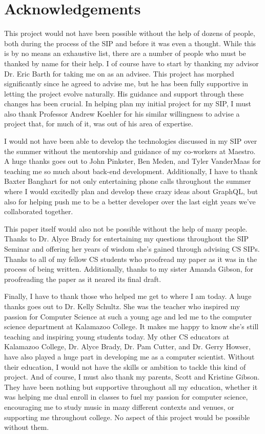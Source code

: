 \section*{Acknowledgements}
This project would not have been possible without the help of dozens of people, both during the process of the SIP and before it was even a thought.  While this is by no means an exhaustive list, there are a number of people who must be thanked by name for their help.  I of course have to start by thanking my advisor Dr. Eric Barth for taking me on as an advisee.  This project has morphed significantly since he agreed to advise me, but he has been fully supportive in letting the project evolve naturally.  His guidance and support through these changes has been crucial.  In helping plan my initial project for my SIP, I must also thank Professor Andrew Koehler for his similar willingness to advise a project that, for much of it, was out of his area of expertise.

I would not have been able to develop the technologies discussed in my SIP over the summer without the mentorship and guidance of my co-workers at Maestro.  A huge thanks goes out to John Pinkster, Ben Meden, and Tyler VanderMaas for teaching me so much about back-end development.  Additionally, I have to thank Baxter Banghart for not only entertaining phone calls throughout the summer where I would excitedly plan and develop these crazy ideas about GraphQL, but also for helping push me to be a better developer over the last eight years we've collaborated together.

This paper itself would also not be possible without the help of many people.  Thanks to Dr. Alyce Brady for entertaining my questions throughout the SIP Seminar and offering her years of wisdom she's gained through advising CS SIPs.  Thanks to all of my fellow CS students who proofread my paper as it was in the process of being written.  Additionally, thanks to my sister Amanda Gibson, for proofreading the paper as it neared its final draft.

Finally, I have to thank those who helped me get to where I am today.  A huge thanks goes out to Dr. Kelly Schultz.  She was the teacher who inspired my passion for Computer Science at such a young age and led me to the computer science department at Kalamazoo College.  It makes me happy to know she's still teaching and inspiring young students today.  My other CS educators at Kalamazoo College, Dr. Alyce Brady, Dr. Pam Cutter, and Dr. Gerry Howser, have also played a huge part in developing me as a computer scientist.  Without their education, I would not have the skills or ambition to tackle this kind of project.   And of course, I must also thank my parents, Scott and Kristine Gibson.  They have been nothing but supportive throughout all my education, whether it was helping me dual enroll in classes to fuel my passion for computer science, encouraging me to study music in many different contexts and venues, or supporting me throughout college. No aspect of this project would be possible without them.
\newpage